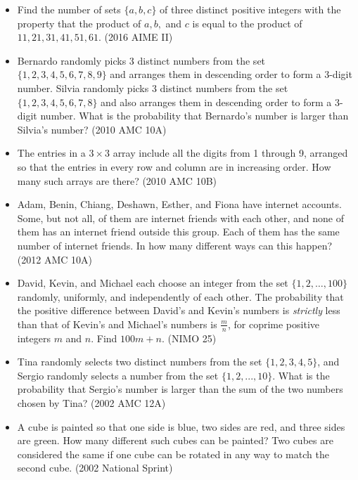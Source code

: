 \documentclass{article}
\begin{document}
\begin{itemize}

\item Find the number of sets $\{a,b,c\}$ of three distinct positive integers with the property that the product of $a,b,$ and $c$ is equal to the product of $11,21,31,41,51,61$. (2016 AIME II)

\item Bernardo randomly picks 3 distinct numbers from the set $\{1,2,3,4,5,6,7,8,9\}$ and arranges them in descending order to form a 3-digit number. Silvia randomly picks 3 distinct numbers from the set $\{1,2,3,4,5,6,7,8\}$ and also arranges them in descending order to form a 3-digit number. What is the probability that Bernardo's number is larger than Silvia's number? (2010 AMC 10A)

\item The entries in a $3 \times 3$ array include all the digits from 1 through 9, arranged so that the entries in every row and column are in increasing order. How many such arrays are there?  (2010 AMC 10B)

\item Adam, Benin, Chiang, Deshawn, Esther, and Fiona have internet accounts. Some, but not all, of them are internet friends with each other, and none of them has an internet friend outside this group. Each of them has the same number of internet friends. In how many different ways can this happen? (2012 AMC 10A)

\item David, Kevin, and Michael each choose an integer from the set $\{1, 2, \ldots, 100\}$ randomly, uniformly, and independently of each other. The probability that the positive difference between David's and Kevin's numbers is \emph{strictly} less than that of Kevin's and Michael's numbers is $\frac{m}{n}$, for coprime positive integers $m$ and $n$. Find $100m+n$. (NIMO 25)

\item Tina randomly selects two distinct numbers from the set $\{ 1, 2, 3, 4, 5 \}$, and Sergio randomly selects a number from the set $\{ 1, 2, ..., 10 \}$. What is the probability that Sergio's number is larger than the sum of the two numbers chosen by Tina?  (2002 AMC 12A)

\item A cube is painted so that one side is blue, two sides are red, and three sides are green. How many different such cubes can be painted? Two cubes are considered the same if one cube can be rotated in any way to match the second cube. (2002 National Sprint)


\end{itemize}
\end{document}

